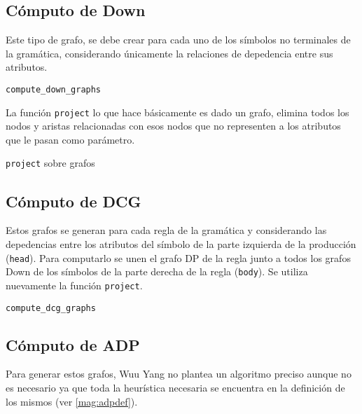 \subsection*{Cómputo de Down}

Este tipo de grafo, se debe crear para cada uno de los símbolos no terminales de la gramática, considerando únicamente la relaciones de depedencia entre sus atributos.

\begin{algorithm}[H]

\caption{\texttt{compute\_down\_graphs}}
\end{algorithm}

La función \texttt{project} lo que hace básicamente es dado un grafo, elimina todos los nodos y aristas relacionadas con esos nodos que no representen a los atributos que le pasan como parámetro.

\begin{algorithm}[H]

\caption{\texttt{project} sobre grafos}
\end{algorithm}

\subsection*{Cómputo de DCG}

Estos grafos se generan para cada regla de la gramática y considerando las depedencias entre los atributos del símbolo de la parte izquierda de la producción (\texttt{head}). Para computarlo se unen el grafo DP de la regla junto a todos los grafos Down de los símbolos de la parte derecha de la regla (\texttt{body}). Se utiliza nuevamente la función \texttt{project}.

\begin{algorithm}[H]

\caption{\texttt{compute\_dcg\_graphs}}
\end{algorithm}

\subsection*{Cómputo de ADP}

Para generar estos grafos, Wuu Yang no plantea un algoritmo preciso aunque no es necesario ya que toda la heurística necesaria se encuentra en la definición de los mismos (ver \ref{mag:adpdef}).


